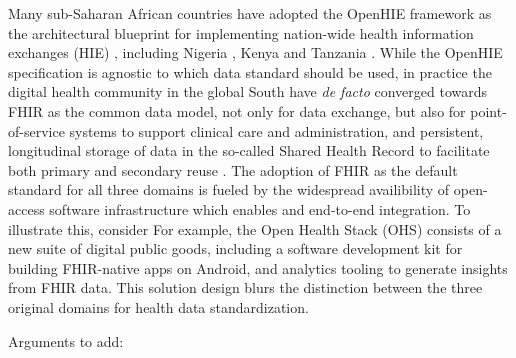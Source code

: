 \documentclass[
  authoryear]{elsarticle}
\begin{document}
Many sub-Saharan African countries have adopted the OpenHIE framework
\citep{openhie} as the architectural blueprint for implementing
nation-wide health information exchanges (HIE) \citep{mamuye2022health},
including Nigeria \citep{dalhatu2023paper}, Kenya
\citep{thaiya2021adoption} and Tanzania \citep{nsaghurwe2021one}. While
the OpenHIE specification is agnostic to which data standard should be
used, in practice the digital health community in the global South have
\emph{de facto} converged towards FHIR as the common data model, not
only for data exchange, but also for point-of-service systems to support
clinical care and administration, and persistent, longitudinal storage
of data in the so-called Shared Health Record to facilitate both primary
and secondary reuse \citep{cascini2024health}. The adoption of FHIR as
the default standard for all three domains is fueled by the widespread
availibility of open-access software infrastructure which enables and
end-to-end integration. To illustrate this, consider For example, the
Open Health Stack (OHS) consists of a new suite of digital public goods,
including a software development kit for building FHIR-native apps on
Android, and analytics tooling to generate insights from FHIR data. This
solution design blurs the distinction between the three original domains
for health data standardization.

Arguments to add:
\end{document}
